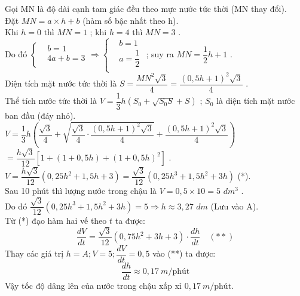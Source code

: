 \begin{ex}
{\begin{center}
\end{center}
Gọi MN là độ dài cạnh tam giác đều theo mực nước tức thời (MN thay đổi).\\
Đặt $MN=a\times h+b$ (hàm số bậc nhất theo h).\\
Khi $h=0$ thì $MN=1$ ; khi $h=4$ thì $MN=3$ .\\
Do đó $\left\{\begin{aligned}
& b=1\\ 
& 4a+b=3\\ 
\end{aligned}\right.\Rightarrow\left\{\begin{aligned}
& b=1\\ 
& a=\dfrac{1}{2}\\ 
\end{aligned}\right.$ ; suy ra $MN=\dfrac{1}{2}h+1$ .\\
Diện tích mặt nước tức thời là $S=\dfrac{M{N^2}\sqrt{3}}{4}=\dfrac{\left(0,5h+1\right)^2\sqrt{3}}{4}$ .\\
Thể tích nước tức thời là $V=\dfrac{1}{3}h\left(S_0+\sqrt{S_0S}+S\right)$ ; $S_0$ là diện tích mặt nước ban đầu (đáy nhỏ).\\
$V=\dfrac{1}{3}h\left(\dfrac{\sqrt{3}}{4}+\sqrt{\dfrac{\sqrt{3}}{4}\cdot\dfrac{\left(0,5h+1\right)^2\sqrt{3}}{4}}+\dfrac{\left(0,5h+1\right)^2\sqrt{3}}{4}\right)$ $=\dfrac{h\sqrt{3}}{12}\left[1+\left(1+0,5h\right)+\left(1+0,5h\right)^2\right]$ .\\
$V=\dfrac{h\sqrt{3}}{12}\left(0,25h^2+1,5h+3\right)=\dfrac{\sqrt{3}}{12}\left(0,25h^3+1,5h^2+3h\right)$ (*).\\
Sau 10 phút thì lượng nước trong chậu là $V=0,5\times 10=5\,\,d{m^3}$ .\\
Do đó $\dfrac{\sqrt{3}}{12}\left(0,25h^3+1,5h^2+3h\right)=5\Rightarrow h\approx 3,27\,\,dm$ (Lưu vào A).\\
Từ (*) đạo hàm hai vế theo $t$ ta được:
$$ \dfrac{dV}{dt} = \dfrac{\sqrt{3}}{12} (0,75h^2 + 3h + 3) \cdot \dfrac{dh}{dt} \quad (**) $$
Thay các giá trị $h = A; V=5; \dfrac{dV}{dt}=0,5$ vào (**) ta được:
$$ \dfrac{dh}{dt} \approx 0,17 \ m/\text{phút} $$
Vậy tốc độ dâng lên của nước trong chậu xấp xỉ $0,17 \ m/\text{phút}$.
}
\end{ex}
